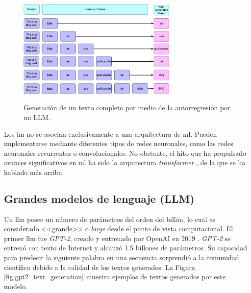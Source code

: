 \begin{figure}[H]
    \caption[Generación de un texto completo por medio de la autorregresión por un LLM]{Generación de un texto completo por medio de la autorregresión por un LLM.}
    \centering
    \includegraphics[width=0.7\textwidth]{./figuras/text-gen-diagram-autoregressive.png}
    \label{fig:llm_generation_example}
\end{figure}

Los \gls{lm} no se asocian exclusivamente a una arquitectura de \gls{ml}. Pueden implementarse mediante diferentes tipos de redes neuronales, como las redes neuronales recurrentes o convolucionales. No obstante, el hito que ha propulsado avances significativos en \gls{ml} ha sido la arquitectura \emph{transformer} \citep{vaswaniAttentionAllYou2017}, de la que se ha hablado más arriba.

\subsection{Grandes modelos de lenguaje (LLM)}

Un \gls{llm} posee un número de parámetros del orden del billón, lo cual es considerado <<grande>> o \emph{large} desde el punto de vista computacional. El primer \gls{llm} fue \emph{GPT-2}, creado y entrenado por OpenAI en 2019 \citep{radfordLanguageModelsAre2019}. \emph{GPT-2} se entrenó con texto de Internet y alcanzó 1.5 billones de parámetros. Su capacidad para predecir la siguiente palabra en una secuencia sorprendió a la comunidad científica debido a la calidad de los textos generados. La Figura \ref{fig:gpt2_text_generation} muestra ejemplos de textos generados por este modelo.

